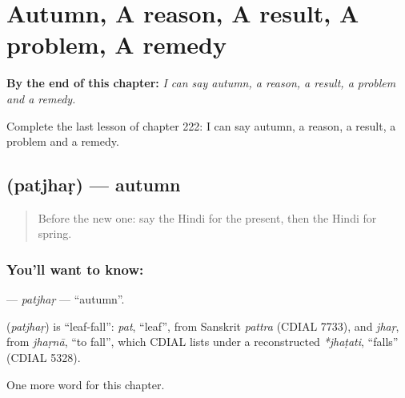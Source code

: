 
\chapter{Autumn, A reason, A result, A problem, A remedy}
\label{ch:hi-autumn-a-reason-a-result-a-problem-a-remedy}

\begin{chapteropening}
\textbf{By the end of this chapter:} \emph{I can say autumn, a reason, a result, a problem and a remedy.}

Complete the last lesson of chapter 222: I can say autumn, a reason, a result, a problem and a remedy.
\end{chapteropening}

\section[\texorpdfstring{\hi{पतझड़} (patjhaṛ)}{पतझड़ (patjhaṛ)}]{ (patjhaṛ) — autumn}

\label{lesson:HI-C222-patjhar}



\begin{quote}
Before the new one: say the Hindi for the present, then the Hindi for spring.
\end{quote}

\subsection*{You'll want to know: }
\textbf{} — \emph{patjhaṛ} — \textquotedblleft{}autumn\textquotedblright{}.

\begin{cousinweb}
\textbf{} (\emph{patjhaṛ}) is \textquotedblleft{}leaf-fall\textquotedblright{}: \emph{pat}, \textquotedblleft{}leaf\textquotedblright{}, from Sanskrit \emph{pattra} (CDIAL 7733), and \emph{jhaṛ}, from \emph{jhaṛnā}, \textquotedblleft{}to fall\textquotedblright{}, which CDIAL lists under a reconstructed \emph{*jhaṭati}, \textquotedblleft{}falls\textquotedblright{} (CDIAL 5328).
\end{cousinweb}

\begin{grammarlens}[title={What you've built}]
One more word for this chapter.
\end{grammarlens}

